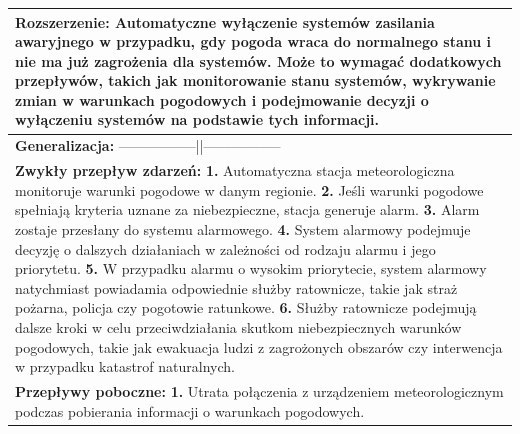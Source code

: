 \documentclass{article}
\begin{document}
\begin{center}
    \begin{center}
        \begin{tabular}{|l|l|l|}
        \hline
        \multicolumn{3}{|p{\dimexpr\linewidth-2\tabcolsep-2\arrayrulewidth}|}{\textbf{Rozszerzenie:}
        \newline
        Automatyczne wyłączenie systemów zasilania awaryjnego w przypadku, gdy pogoda wraca do normalnego stanu
        i nie ma już zagrożenia dla systemów. Może to wymagać dodatkowych przepływów,
        takich jak monitorowanie stanu systemów, wykrywanie zmian w warunkach pogodowych
        i podejmowanie decyzji o wyłączeniu systemów na podstawie tych informacji.} \\
        \hline
        \hline
        \multicolumn{3}{|p{\dimexpr\linewidth-2\tabcolsep-2\arrayrulewidth}|}{\textbf{Generalizacja:} -----------------||----------------- } \\
        \hline
        \hline
        \multicolumn{3}{|p{\dimexpr\linewidth-2\tabcolsep-2\arrayrulewidth}|}{\textbf{Zwykły przepływ zdarzeń:}
        \newline
        \textbf{1.} Automatyczna stacja meteorologiczna monitoruje warunki pogodowe w danym regionie.
        \newline
        \textbf{2.} Jeśli warunki pogodowe spełniają kryteria uznane za niebezpieczne, stacja generuje alarm.
        \newline
        \textbf{3.} Alarm zostaje przesłany do systemu alarmowego.
        \newline
        \textbf{4.} System alarmowy podejmuje decyzję o dalszych działaniach w zależności od rodzaju alarmu i jego priorytetu.
        \newline
        \textbf{5.} W przypadku alarmu o wysokim priorytecie, system alarmowy natychmiast powiadamia odpowiednie służby ratownicze, takie jak straż pożarna, policja czy pogotowie ratunkowe.
        \newline
        \textbf{6.} Służby ratownicze podejmują dalsze kroki w celu przeciwdziałania skutkom niebezpiecznych warunków pogodowych, takie jak ewakuacja ludzi z zagrożonych obszarów czy interwencja w przypadku katastrof naturalnych.} \\
        \hline
        \hline
        \multicolumn{3}{|p{\dimexpr\linewidth-2\tabcolsep-2\arrayrulewidth}|}{\textbf{Przepływy poboczne:}
        \newline
        \textbf{1.} Utrata połączenia z urządzeniem meteorologicznym podczas pobierania informacji o warunkach pogodowych.
}
\end{tabular}
\end{center}
\end{center}
\end{document}
